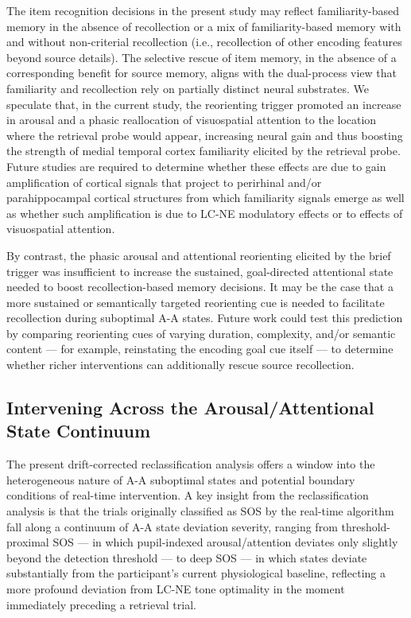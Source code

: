 The item recognition decisions in the present study may reflect familiarity-based memory in the absence of recollection or a mix of familiarity-based memory with and without non-criterial recollection (i.e., recollection of other encoding features beyond source details). The selective rescue of item memory, in the absence of a corresponding benefit for source memory, aligns with the dual-process view that familiarity and recollection rely on partially distinct neural substrates. We speculate that, in the current study, the reorienting trigger promoted an increase in arousal and a phasic reallocation of visuospatial attention to the location where the retrieval probe would appear, increasing neural gain and thus boosting the strength of medial temporal cortex familiarity elicited by the retrieval probe. Future studies are required to determine whether these effects are due to gain amplification of cortical signals that project to perirhinal and/or parahippocampal cortical structures from which familiarity signals emerge as well as whether such amplification is due to LC-NE modulatory effects or to effects of visuospatial attention.

By contrast, the phasic arousal and attentional reorienting elicited by the brief trigger was insufficient to increase the sustained, goal-directed attentional state needed to boost recollection-based memory decisions. It may be the case that a more sustained or semantically targeted reorienting cue is needed to facilitate recollection during suboptimal A-A states. Future work could test this prediction by comparing reorienting cues of varying duration, complexity, and/or semantic content — for example, reinstating the encoding goal cue itself — to determine whether richer interventions can additionally rescue source recollection.

\subsection{Intervening Across the Arousal/Attentional State Continuum}

The present drift-corrected reclassification analysis offers a window into the heterogeneous nature of A-A suboptimal states and potential boundary conditions of real-time intervention. A key insight from the reclassification analysis is that the trials originally classified as SOS by the real-time algorithm fall along a continuum of A-A state deviation severity, ranging from threshold-proximal SOS –– in which pupil-indexed arousal/attention deviates only slightly beyond the detection threshold — to deep SOS — in which states deviate substantially from the participant's current physiological baseline, reflecting a more profound deviation from LC-NE tone optimality in the moment immediately preceding a retrieval trial.

